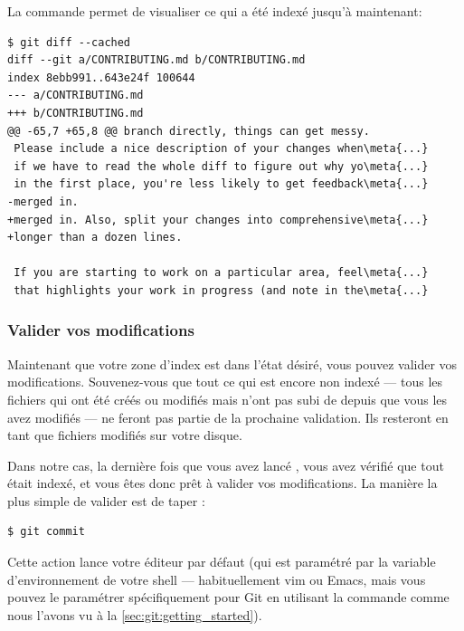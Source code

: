 La commande  permet de visualiser ce qui a été indexé jusqu'à maintenant:
\begin{Schunk}
\begin{Verbatim}[commandchars=\\\{\}]
$ git diff --cached
diff --git a/CONTRIBUTING.md b/CONTRIBUTING.md
index 8ebb991..643e24f 100644
--- a/CONTRIBUTING.md
+++ b/CONTRIBUTING.md
@@ -65,7 +65,8 @@ branch directly, things can get messy.
 Please include a nice description of your changes when\meta{...}
 if we have to read the whole diff to figure out why yo\meta{...}
 in the first place, you're less likely to get feedback\meta{...}
-merged in.
+merged in. Also, split your changes into comprehensive\meta{...}
+longer than a dozen lines.

 If you are starting to work on a particular area, feel\meta{...}
 that highlights your work in progress (and note in the\meta{...}
\end{Verbatim}
\end{Schunk}


\subsubsection{Valider vos modifications}
\label{sec:git:committing_changes}

Maintenant que votre zone d'index est dans l'état désiré, vous pouvez valider vos modifications.
Souvenez-vous que tout ce qui est encore non indexé --- tous les fichiers qui ont été créés ou modifiés mais n'ont pas subi de  depuis que vous les avez modifiés  --- ne feront pas partie de la prochaine validation.
Ils resteront en tant que fichiers modifiés sur votre disque.

Dans notre cas, la dernière fois que vous avez lancé , vous avez vérifié que tout était indexé, et vous êtes donc prêt à valider vos modifications.
La manière la plus simple de valider est de taper :
\begin{Schunk}
\begin{Verbatim}
$ git commit
\end{Verbatim}
\end{Schunk}

Cette action lance votre éditeur par défaut (qui est paramétré par la variable d'environnement  de votre shell --- habituellement vim ou Emacs, mais vous pouvez le paramétrer spécifiquement pour Git en utilisant la commande  comme nous l'avons vu à la \autoref{sec:git:getting_started}).

